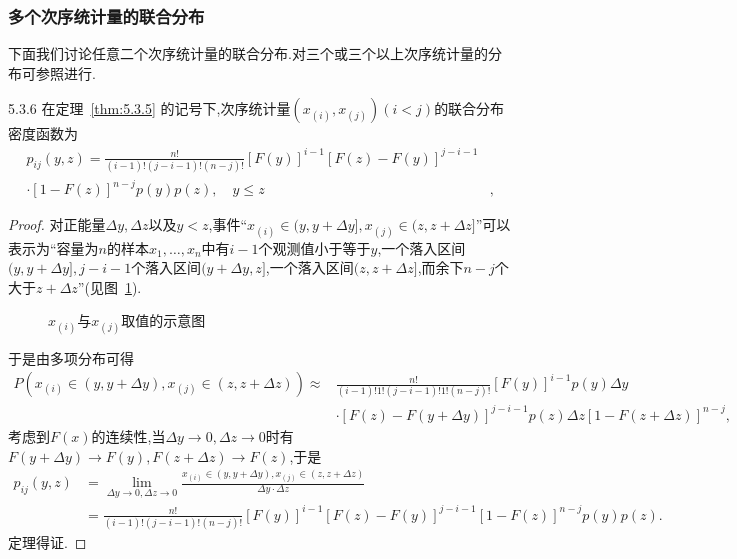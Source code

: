 \subsubsection{多个次序统计量的联合分布}
下面我们讨论任意二个次序统计量的联合分布.对三个或三个以上次序统计量的分布可参照进行.
\begin{theorem}{}{5.3.6}
在定理~\ref{thm:5.3.5} 的记号下,次序统计量$(x_{(i)},x_{(j)})(i<j)$的联合分布密度函数为
\begin{equation}\label{eq:5.3.16}
\begin{aligned}
p_{ij}(y,z)=\frac{n!}{(i-1)!(j-i-1)!(n-j)!}[F(y)]^{i-1}[F(z)-F(y)]^{j-i-1}&\\
\cdot[1-F(z)]^{n-j}p(y)p(z),\quad y\leq z&,
\end{aligned}
\end{equation}
\end{theorem}
\begin{proof}
对正能量$\Delta y,\Delta z$以及$y<z$,事件``$x_{(i)}\in(y,y+\Delta y],x_{(j)}\in(z,z+\Delta z]$''可以表示为``容量为$n$的样本$x_1,\dotsc,x_n$中有$i-1$个观测值小于等于$y$,一个落入区间$(y,y+\Delta y],j-i-1$个落入区间$(y+\Delta y,z]$,一个落入区间$(z,z+\Delta z]$,而余下$n-j$个大于$z+\Delta z$''(见图~\ref{fig:5.3.6}).
\begin{figure}[!ht]
  \centering
{}
  \caption{$x_{(i)}$与$x_{(j)}$取值的示意图}\label{fig:5.3.6}
\end{figure}

于是由多项分布可得
\begin{align*}
P(x_{(i)}\in(y,y+\Delta y),x_{(j)}\in(z,z+\Delta z))
\approx&\frac{n!}{(i-1)!1!(j-i-1)!1!(n-j)!}[F(y)]^{i-1}p(y)\Delta y\\
 &\cdot[F(z)-F(y+\Delta y)]^{j-i-1}p(z)\Delta z[1-F(z+\Delta z)]^{n-j},
\end{align*}
考虑到$F(x)$的连续性,当$\Delta y\to0,\Delta z\to0$时有$F(y+\Delta y)\to F(y),F(z+\Delta z)\to F(z)$,于是
\begin{align*}
p_{ij}(y,z)&=\lim_{\Delta y\to0,\Delta z\to0}
\frac{x_{(i)}\in(y,y+\Delta y),x_{(j)}\in(z,z+\Delta z)}{\Delta y\cdot\Delta z}\\
&=\frac{n!}{(i-1)!(j-i-1)!(n-j)!}[F(y)]^{i-1}[F(z)-F(y)]^{j-i-1}[1-F(z)]^{n-j}p(y)p(z).
\end{align*}
定理得证.
\end{proof}

